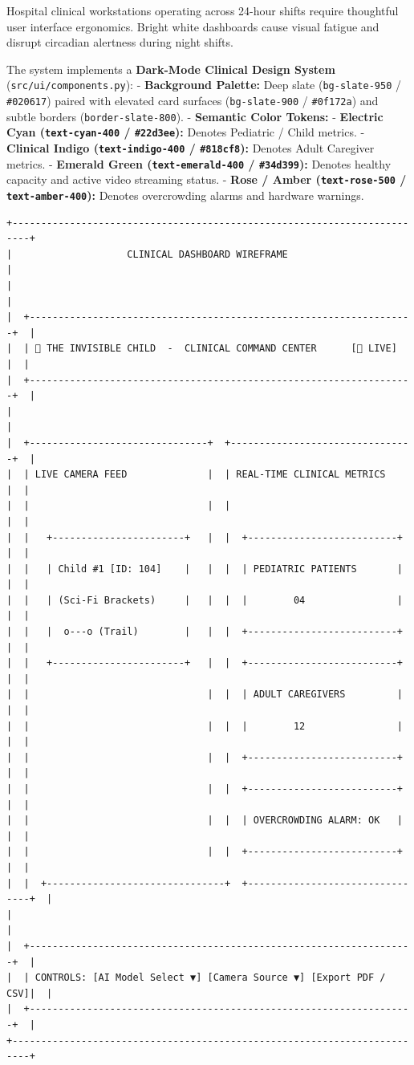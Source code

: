 Hospital clinical workstations operating across 24-hour shifts require
thoughtful user interface ergonomics. Bright white dashboards cause
visual fatigue and disrupt circadian alertness during night shifts.

The system implements a \textbf{Dark-Mode Clinical Design System}
(\texttt{src/ui/components.py}): - \textbf{Background Palette:} Deep
slate (\texttt{bg-slate-950} / \texttt{\#020617}) paired with elevated
card surfaces (\texttt{bg-slate-900} / \texttt{\#0f172a}) and subtle
borders (\texttt{border-slate-800}). - \textbf{Semantic Color Tokens:} -
\textbf{Electric Cyan (\texttt{text-cyan-400} / \texttt{\#22d3ee}):}
Denotes Pediatric / Child metrics. - \textbf{Clinical Indigo
(\texttt{text-indigo-400} / \texttt{\#818cf8}):} Denotes Adult Caregiver
metrics. - \textbf{Emerald Green (\texttt{text-emerald-400} /
\texttt{\#34d399}):} Denotes healthy capacity and active video streaming
status. - \textbf{Rose / Amber (\texttt{text-rose-500} /
\texttt{text-amber-400}):} Denotes overcrowding alarms and hardware
warnings.

\begin{verbatim}
+-------------------------------------------------------------------------+
|                    CLINICAL DASHBOARD WIREFRAME                         |
|                                                                         |
|  +-------------------------------------------------------------------+  |
|  | 🏥 THE INVISIBLE CHILD  -  CLINICAL COMMAND CENTER      [🔴 LIVE]   |  |
|  +-------------------------------------------------------------------+  |
|                                                                         |
|  +-------------------------------+  +--------------------------------+  |
|  | LIVE CAMERA FEED              |  | REAL-TIME CLINICAL METRICS     |  |
|  |                               |  |                                |  |
|  |   +-----------------------+   |  |  +--------------------------+  |  |
|  |   | Child #1 [ID: 104]    |   |  |  | PEDIATRIC PATIENTS       |  |  |
|  |   | (Sci-Fi Brackets)     |   |  |  |        04                |  |  |
|  |   |  o---o (Trail)        |   |  |  +--------------------------+  |  |
|  |   +-----------------------+   |  |  +--------------------------+  |  |
|  |                               |  |  | ADULT CAREGIVERS         |  |  |
|  |                               |  |  |        12                |  |  |
|  |                               |  |  +--------------------------+  |  |
|  |                               |  |  +--------------------------+  |  |
|  |                               |  |  | OVERCROWDING ALARM: OK   |  |  |
|  |                               |  |  +--------------------------+  |  |
|  |  +-------------------------------+  +--------------------------------+  |
|                                                                         |
|  +-------------------------------------------------------------------+  |
|  | CONTROLS: [AI Model Select ▼] [Camera Source ▼] [Export PDF / CSV]|  |
|  +-------------------------------------------------------------------+  |
+-------------------------------------------------------------------------+
\end{verbatim}

